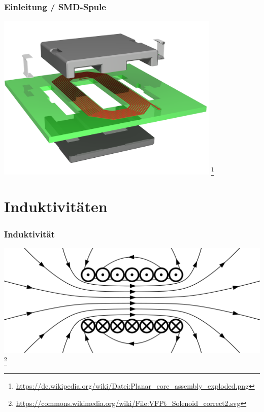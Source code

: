 \begin{frame}
    \frametitle{Einleitung / SMD-Spule}

    \begin{center}
        \includegraphics[width=0.8\textwidth]{e06/smd-Spule.png}
        \footnote{\tiny \url{https://de.wikipedia.org/wiki/Datei:Planar_core_assembly_exploded.png}}
    \end{center}
 	
\end{frame}

\section*{Induktivitäten}
\begin{frame}
    \frametitle{Induktivität}
	
	\begin{center}
        \includegraphics[width=1\textwidth]{e06/H-Feld.png}
        \footnote{\tiny \url{https://commons.wikimedia.org/wiki/File:VFPt_Solenoid_correct2.svg}}
    \end{center}
    
\end{frame}

